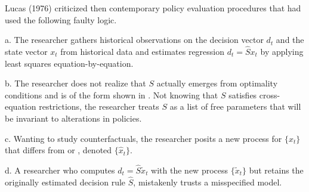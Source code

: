 Lucas (1976) criticized then contemporary policy evaluation procedures  that had used the following faulty logic.

\medskip


\item{a.}  The researcher gathers   historical observations on the decision vector $d_t$ and the state vector $x_t$ from historical data and estimates %
 regression  $d_t = \hat S x_t$ %
by applying  least squares  equation-by-equation. %


\medskip

\item{b.} The  researcher  does not realize that $S$ actually emerges from optimality conditions and is of the form
shown in %
 . Not knowing that $S$ satisfies  cross-equation restrictions, the researcher treats $S$ as a list of free 
parameters that will be  invariant to alterations in  policies. 




\medskip

\item{c.}  Wanting to study counterfactuals, the researcher posits a new process
for $\{x_t\}$ that differs from  or , denoted $\{\hat x_t\}$.


\medskip

\item{d.} A researcher who computes $d_t = \hat S \tilde x_t$ with the new process $\{\tilde x_t\}$ but retains the originally estimated decision rule $\hat S$,  mistakenly trusts a misspecified model. 


